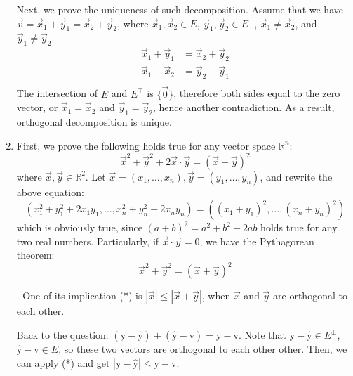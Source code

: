 \documentclass{article}
\begin{document}
\begin{enumerate}[1.]
Next, we prove the uniqueness of such decomposition. Assume that we have $\vec{v} = \vec{x}_1 + \vec{y}_1 = \vec{x}_2 + \vec{y}_2$, where $\vec{x}_1, \vec{x}_2 \in E$, $\vec{y}_1, \vec{y}_2 \in E^{\bot}$, $\vec{x}_1 \neq \vec{x}_2$, and $\vec{y}_1 \neq \vec{y}_2$.
$$
\begin{aligned}
\vec{x}_1 + \vec{y}_1 &= \vec{x}_2 + \vec{y}_2 \\
\vec{x}_1 - \vec{x}_2 &= \vec{y}_2 - \vec{y}_1 \\
\end{aligned}
$$
The intersection of $E$ and $E^{\top}$ is $\{\vec{0}\}$, therefore both sides equal to the zero vector, or $\vec{x}_1 = \vec{x}_2$ and $\vec{y}_1 = \vec{y}_2$, hence another contradiction. As a result, orthogonal decomposition is unique. \rQED

\item 
First, we prove the following holds true for any vector space $\mathbb{R}^n$:
$$\vec{x}^2 + \vec{y}^2 + 2\vec{x}\cdot\vec{y} = (\vec{x} + \vec{y})^2$$
where $\vec{x}, \vec{y} \in \mathbb{R}^2$. Let $\vec{x} = (x_1, \hdots, x_n), \vec{y} = (y_1, \hdots, y_n)$, and rewrite the above equation:
$$(x_1^2 + y_1^2 + 2x_1y_1, \hdots, x_n^2 + y_n^2 + 2x_ny_n) = ((x_1 + y_1)^2, \hdots, (x_n+y_n)^2)$$
which is obviously true, since $(a+b)^2 = a^2+b^2+2ab$ holds true for any two real numbers. Particularly, if $\vec{x} \cdot \vec{y} = 0$, we have the Pythagorean theorem:
$$\vec{x}^2 + \vec{y}^2 = (\vec{x} + \vec{y})^2$$

. One of its implication (*) is $|\vec{x}| \leq |\vec{x} + \vec{y}|$, when $\vec{x}$ and $\vec{y}$ are orthogonal to each other.

\newcommand \vecb[1]{\boldsymbol{\mathrm{#1}}}

Back to the question. $(\vecb{y} - \vecb{\hat{y}}) + (\vecb{\hat{y}} - \vecb{v}) = \vecb{y} - \vecb{v}$. Note that $\vecb{y} - \vecb{\hat{y}} \in E^{\bot}$, $\vecb{\hat{y}} - \vecb{v} \in E$, so these two vectors are orthogonal to each other other. Then, we can apply (*) and get $|\vecb{y} - \vecb{\hat{y}}| \leq \vecb{y} - \vecb{v}$. \rQED


\end{enumerate}
\end{document}
